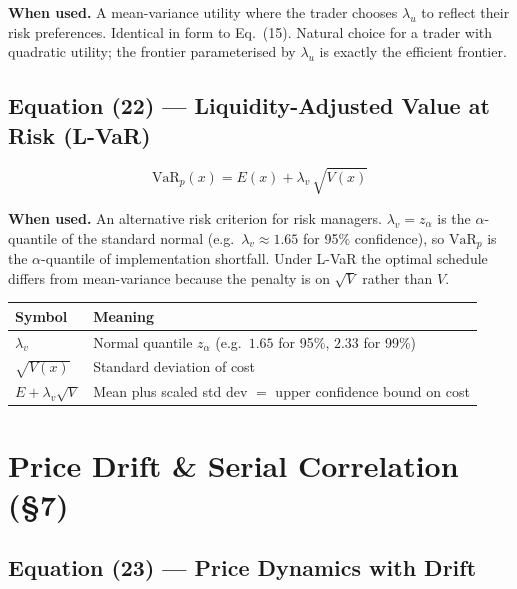 \documentclass[11pt,a4paper]{article}
\begin{document}
\textbf{When used.} A mean-variance utility where the trader chooses $\lambda_u$ to
reflect their risk preferences.  Identical in form to Eq.~(15).  Natural choice for a
trader with quadratic utility; the frontier parameterised by $\lambda_u$ is exactly the
efficient frontier.

\subsection*{Equation (22) — Liquidity-Adjusted Value at Risk (L-VaR)}

\begin{equation}
  \mathrm{VaR}_p(x) = E(x) + \lambda_v\,\sqrt{V(x)}
\end{equation}

\textbf{When used.} An alternative risk criterion for risk managers.  $\lambda_v = z_\alpha$
is the $\alpha$-quantile of the standard normal (e.g.\ $\lambda_v\approx1.65$ for 95\%
confidence), so $\mathrm{VaR}_p$ is the $\alpha$-quantile of implementation shortfall.
Under L-VaR the optimal schedule differs from mean-variance because the penalty is on
$\sqrt{V}$ rather than $V$.

\begin{center}
\begin{tabular}{@{}L{3.5cm}L{10cm}@{}}
\toprule
\textbf{Symbol} & \textbf{Meaning} \\
\midrule
$\lambda_v$ & Normal quantile $z_\alpha$ (e.g.\ $1.65$ for 95\%, $2.33$ for 99\%) \\
$\sqrt{V(x)}$ & Standard deviation of cost \\
$E + \lambda_v\sqrt{V}$ & Mean plus scaled std dev $=$ upper confidence bound on cost \\
\bottomrule
\end{tabular}
\end{center}

\section{Price Drift \& Serial Correlation (\texorpdfstring{\S}{§}7)}

\subsection*{Equation (23) — Price Dynamics with Drift}
\end{document}
